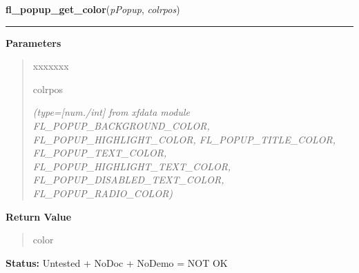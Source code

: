 \hspace{.8\funcindent}\begin{boxedminipage}{\funcwidth}

    \raggedright \textbf{fl\_popup\_get\_color}(\textit{pPopup}, \textit{colrpos})

    \vspace{-1.5ex}

    \rule{\textwidth}{0.5\fboxrule}
\setlength{\parskip}{2ex}
\setlength{\parskip}{1ex}
      \textbf{Parameters}
      \vspace{-1ex}

      \begin{quote}
        \begin{Ventry}{xxxxxxx}

          \item[colrpos]

            {\it (type=[num./int] from xfdata module FL\_POPUP\_BACKGROUND\_COLOR, 
FL\_POPUP\_HIGHLIGHT\_COLOR, FL\_POPUP\_TITLE\_COLOR, 
FL\_POPUP\_TEXT\_COLOR, FL\_POPUP\_HIGHLIGHT\_TEXT\_COLOR, 
FL\_POPUP\_DISABLED\_TEXT\_COLOR, FL\_POPUP\_RADIO\_COLOR)}

        \end{Ventry}

      \end{quote}

      \textbf{Return Value}
    \vspace{-1ex}

      \begin{quote}
      color

      \end{quote}

\textbf{Status:} Untested + NoDoc + NoDemo = NOT OK



    \end{boxedminipage}

    \label{xformslib:library:fl_popup_set_color}

    \vspace{0.5ex}

